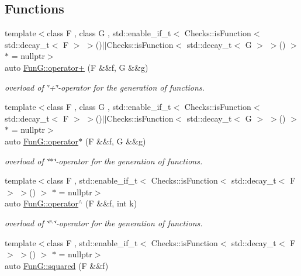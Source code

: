 \subsection*{Functions}
\begin{DoxyCompactItemize}
\item 
{\footnotesize template$<$class F , class G , std\+::enable\+\_\+if\+\_\+t$<$ Checks\+::is\+Function$<$ std\+::decay\+\_\+t$<$ F $>$ $>$()$\vert$$\vert$\+Checks\+::is\+Function$<$ std\+::decay\+\_\+t$<$ G $>$ $>$() $>$ $\ast$  = nullptr$>$ }\\auto \hyperlink{namespaceFunG_a24bb5d609b022030afda2d8589cf5509}{Fun\+G\+::operator+} (F \&\&f, G \&\&g)
\begin{DoxyCompactList}\small\item\em overload of \char`\"{}+\char`\"{}-\/operator for the generation of functions. \end{DoxyCompactList}\item 
{\footnotesize template$<$class F , class G , std\+::enable\+\_\+if\+\_\+t$<$ Checks\+::is\+Function$<$ std\+::decay\+\_\+t$<$ F $>$ $>$()$\vert$$\vert$\+Checks\+::is\+Function$<$ std\+::decay\+\_\+t$<$ G $>$ $>$() $>$ $\ast$  = nullptr$>$ }\\auto \hyperlink{namespaceFunG_a267562e725c73ece1c1d057b5f29511f}{Fun\+G\+::operator$\ast$} (F \&\&f, G \&\&g)
\begin{DoxyCompactList}\small\item\em overload of \char`\"{}$\ast$\char`\"{}-\/operator for the generation of functions. \end{DoxyCompactList}\item 
{\footnotesize template$<$class F , std\+::enable\+\_\+if\+\_\+t$<$ Checks\+::is\+Function$<$ std\+::decay\+\_\+t$<$ F $>$ $>$() $>$ $\ast$  = nullptr$>$ }\\auto \hyperlink{namespaceFunG_a94273e3ea80324e591bb98ae3c051221}{Fun\+G\+::operator$^\wedge$} (F \&\&f, int k)
\begin{DoxyCompactList}\small\item\em overload of \char`\"{}$^\wedge$\char`\"{}-\/operator for the generation of functions. \end{DoxyCompactList}\item 
{\footnotesize template$<$class F , std\+::enable\+\_\+if\+\_\+t$<$ Checks\+::is\+Function$<$ std\+::decay\+\_\+t$<$ F $>$ $>$() $>$ $\ast$  = nullptr$>$ }\\auto \hyperlink{namespaceFunG_ac4ffc0754104af6ddf114e154251db78}{Fun\+G\+::squared} (F \&\&f)

\end{DoxyCompactItemize}
